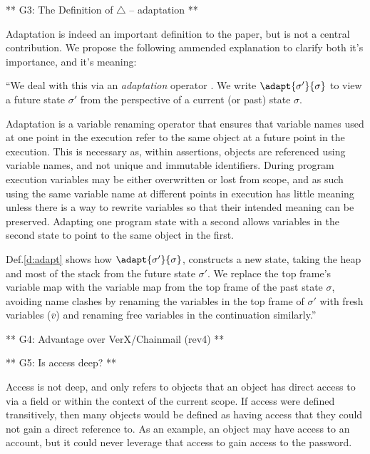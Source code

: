 ** G3: The Definition of $\triangle$ -- adaptation **

Adaptation is indeed an important definition to the paper, but is not a central contribution. We propose the following ammended explanation to clarify both it's importance, and it's meaning:

``We deal with this via an \emph{adaptation} operator \cite{FASE}. We
  write
  $\adapt {\sigma'} {\sigma}$
  to view a future state $\sigma'$ from the perspective of a current
  (or past) state $\sigma$.

Adaptation is a variable renaming operator that ensures that variable names 
used at one point in the execution refer to the same object at a future point in the execution. 
This is necessary as, within assertions, objects are referenced using variable names, and not unique and immutable identifiers.
During program execution variables may be either overwritten or lost from scope, and as such using the same variable name at 
different points in execution has little meaning unless there is a way to rewrite variables so that their intended meaning can 
be preserved. Adapting one program state with a second allows variables in the second state to point to the same object in the first.

Def.\ref{d:adapt} shows how $\adapt{\sigma'}{\sigma}$, constructs a new
state, taking the heap and most of the stack from the future state 
$\sigma'$. We replace the top frame's variable map 
with the variable map from the top frame of the past state $\sigma$,
avoiding name clashes by renaming the 
variables in the top frame of $\sigma'$ with fresh variables
($\overline{v}$) and renaming free variables in the continuation similarly.''





** G4: Advantage over VerX/Chainmail (rev4) **


** G5: Is access deep? **

Access is not deep, and only refers to objects that an object has direct access to via a field or within the context of the current scope. If access were defined transitively, then
many objects would be defined as having access that they could not gain a direct reference to. As an example, an object may have access to an account, but it could never leverage
that access to gain access to the password.

